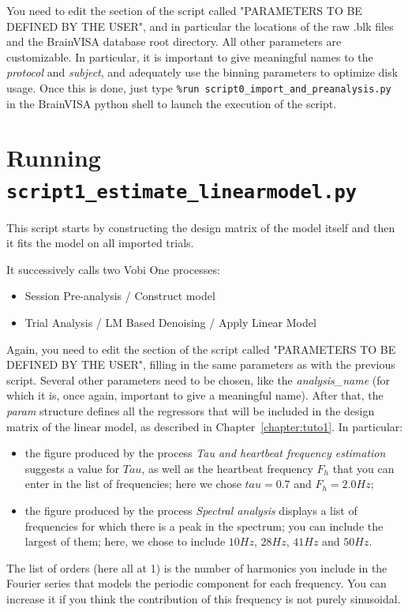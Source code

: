 You need to edit the section of the script called "PARAMETERS TO BE DEFINED BY THE USER", and in particular the locations of the raw .blk files and the BrainVISA database root directory.
All other parameters are customizable. In particular, it is important to give meaningful names to the \textit{protocol} and \textit{subject}, and adequately use the binning parameters to optimize disk usage.
Once this is done, just type \texttt{\%run script0\_import\_and\_preanalysis.py} in the BrainVISA python shell to launch the execution of the script.


\section{Running \texttt{script1\_estimate\_linearmodel.py}}

This script starts by constructing the design matrix of the model itself and then it fits the model on all imported trials.

It successively calls two Vobi One processes:
\begin{itemize}
  \item Session Pre-analysis / Construct model
  \item Trial Analysis / LM Based Denoising / Apply Linear Model
\end{itemize}

Again, you need to edit the section of the script called "PARAMETERS TO BE DEFINED BY THE USER", filling in the same parameters as with the previous script. Several other parameters need to be chosen, like the \textit{analysis\_name} (for which it is, once again, important to give a meaningful name). After that, the \textit{param} structure defines all the regressors that will be included in the design matrix of the linear model, as described in Chapter~\ref{chapter:tuto1}. In particular:
\begin{itemize}
  \item the figure produced by the process \textit{Tau and heartbeat frequency estimation} suggests a value for $Tau$, as well as the heartbeat frequency $F_h$ that you can enter in the list of frequencies; here we chose $tau = 0.7$ and $F_h = 2.0Hz$;
  \item the figure produced by the process \textit{Spectral analysis} displays a list of frequencies for which there is a peak in the spectrum; you can include the largest of them; here, we chose to include $10Hz$, $28Hz$, $41Hz$ and $50Hz$.
\end{itemize}
The list of orders (here all at 1) is the number of harmonics you include in the Fourier series that models the periodic component for each frequency. You can increase it if you think the contribution of this frequency is not purely sinusoidal.


